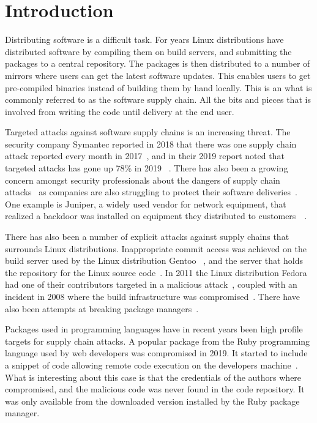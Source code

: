 \documentclass[../Main/thesis.tex]{subfiles}
\begin{document}
\chapter{Introduction}\label{ch:introduction}
Distributing software is a difficult task. For years Linux distributions have
distributed software by compiling them on build servers, and submitting the
packages to a central repository. The packages is then distributed to a number
of mirrors where users can get the latest software updates. This enables users
to get pre-compiled binaries instead of building them by hand locally. This is
an what is commonly referred to as the software supply chain. All the bits and
pieces that is involved from writing the code until delivery at the end user.

Targeted attacks against software supply chains is an increasing threat. The
security company Symantec reported in 2018 that there was one supply chain
attack reported every month in 2017~\cite{symantec-istr-2018}, and in their 2019
report noted that targeted attacks has gone up 78\% in 2019
~\cite{symantec-istr-2019}. There has also been a growing concern amongst
security professionals about the dangers of supply chain
attacks~\cite{crowdstrike-supply-chain-attacks} as companies are also struggling
to protect their software deliveries~\cite{cd-pipelines-case-study}. One example
is Juniper, a widely used vendor for network equipment, that realized a backdoor
was installed on equipment they distributed to
customers~\cite{Checkoway:2016:SAJ:2976749.2978395}~\cite{juniper-backdoor-advisory}.

There has also been a number of explicit attacks against supply chains that
surrounds Linux distributions. Inappropriate commit access was achieved on the
build server used by the Linux distribution Gentoo
~\cite{gentoo-compromise-2018}, and the server that holds the repository for the
Linux source code~\cite{linux-compromise-2011}.  In 2011 the Linux distribution
Fedora had one of their contributors targeted in a malicious
attack~\cite{fedora-compromise-2011}, coupled with an incident in 2008 where the
build infrastructure was compromised~\cite{fedora-compromise-2008}. There have
also been attempts at breaking package
managers~\cite{Cappos:2008:LMA:1455770.1455841}.

Packages used in programming languages have in recent years been high profile
targets for supply chain attacks. A popular package from the Ruby programming
language used by web developers was compromised in 2019. It started to include a
snippet of code allowing remote code execution on the developers
machine~\cite{malicious-ruby}. What is interesting about this case is that the
credentials of the authors where compromised, and the malicious code was never
found in the code repository. It was only available from the downloaded version
installed by the Ruby package manager.
\end{document}
